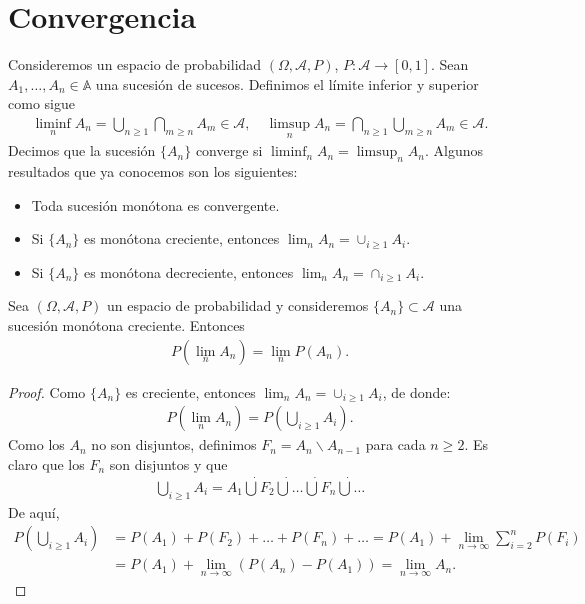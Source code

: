 \chapter{Convergencia}
Consideremos un espacio de probabilidad $(\Omega, \mathcal{A}, P)$, $P : \mathcal{A} \longrightarrow [0,1]$. Sean $A_1,\ldots,A_n \in \mathbb{A}$ una sucesión de sucesos. Definimos el límite inferior y superior como sigue
\begin{align*}
    \liminf_{n} A_n = \bigcup_{n \ge 1} \bigcap_{m \ge n} A_m \in \mathcal{A}, \quad
    \limsup_{n} A_n = \bigcap_{n \ge 1} \bigcup_{m \ge n} A_m \in \mathcal{A}.
\end{align*}
Decimos que la sucesión $\{A_n\}$ converge si $\liminf_{n} A_n = \limsup_{n} A_n$. Algunos resultados que ya conocemos son los siguientes:
\begin{itemize}
    \item Toda sucesión monótona es convergente.
    \item Si $\{A_n\}$ es monótona creciente, entonces $\lim_{n} A_n = \cup_{i\ge1} A_i$.
    \item Si $\{A_n\}$ es monótona decreciente, entonces $\lim_{n} A_n = \cap_{i\ge1} A_i$.
\end{itemize}
\begin{teo}
    Sea $(\Omega,\mathcal{A},P)$ un espacio de probabilidad y consideremos $\{A_n\} \subset \mathcal{A}$ una sucesión monótona creciente. Entonces
    \begin{align*}
        P\left( \lim_n A_n \right) = \lim_n P(A_n).
    \end{align*}
\end{teo}

\begin{proof}
    Como $\{A_n\}$ es creciente, entonces $\lim_{n} A_n = \cup_{i\ge1} A_i$, de donde:
    \begin{align*}
        P\left( \lim_n A_n \right) = P\left( \bigcup_{i\ge1} A_i \right).
    \end{align*}
    Como los $A_n$ no son disjuntos, definimos $F_n = A_n \backslash A_{n-1}$ para cada $n \ge 2$. Es claro que los $F_n$ son disjuntos y que
    \begin{align*}
        \bigcup_{i\ge1} A_i = A_1 \dot \bigcup F_2 \dot \bigcup \ldots \dot \bigcup F_n \dot \bigcup \ldots
    \end{align*}
    De aquí,
    \begin{align*}
        P \left( \bigcup_{i \ge 1} A_i\right) & = P(A_1) + P(F_2) + \ldots + P(F_n) + \ldots
        = P(A_1) + \lim_{n \to \infty} \sum_{i=2}^{n} P(F_i)                                                                \\
                                              & = P(A_1) + \lim_{n \to \infty} (P(A_n) - P(A_1)) = \lim_{n \to \infty} A_n.
    \end{align*}
\end{proof}

